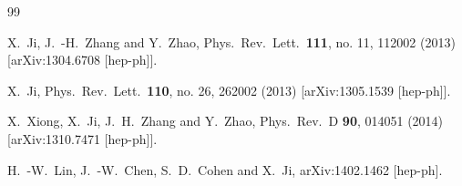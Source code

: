 \begin{thebibliography}{99}




  X.~Ji, J.~-H.~Zhang and Y.~Zhao,
  Phys.\ Rev.\ Lett.\  {\bf 111}, no. 11, 112002 (2013)
  [arXiv:1304.6708 [hep-ph]].


  X.~Ji,
  Phys.\ Rev.\ Lett.\  {\bf 110}, no. 26, 262002 (2013)
  [arXiv:1305.1539 [hep-ph]].


  X.~Xiong, X.~Ji, J.~H.~Zhang and Y.~Zhao,
  Phys.\ Rev.\ D {\bf 90}, 014051 (2014)
  [arXiv:1310.7471 [hep-ph]].


  H.~-W.~Lin, J.~-W.~Chen, S.~D.~Cohen and X.~Ji,
  arXiv:1402.1462 [hep-ph].



\end{thebibliography}
